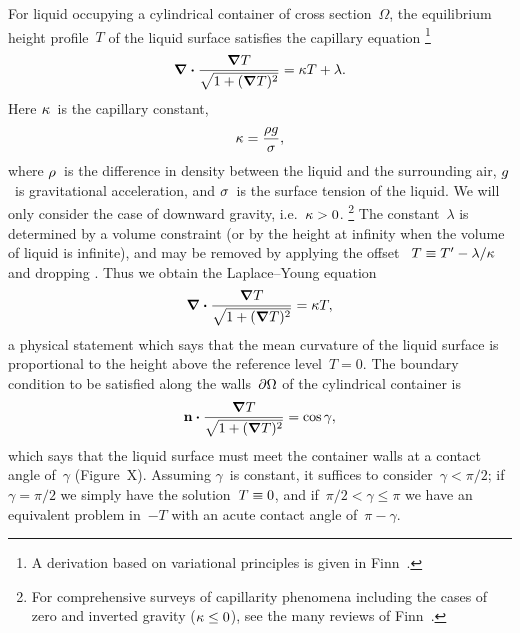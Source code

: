 For liquid occupying a cylindrical container of cross section~$\Omega$,
the equilibrium height profile~$T$ of the liquid surface
satisfies the capillary equation%
\footnote{
  A derivation based on variational principles is given
  in Finn~\cite[Chapter~1]{finn-1986-equilibrium-capillary-surfaces}.
}
\begin{equation}
  \mathop{}\!\boldsymbol{\mathbf{\nabla}} \boldsymbol{\cdot} \frac{\mathop{}\!\boldsymbol{\mathbf{\nabla}} T}{\sqrt{1 + (\mathop{}\!\boldsymbol{\mathbf{\nabla}} T)^2}} = \kappa T + \lambda.
  \label{eq:capillary}
\end{equation}
Here $\kappa$~is the capillary constant,
\begin{equation}
  \kappa = \frac{\rho g}{\sigma},
  \label{eq:capillary-constant}
\end{equation}
where $\rho$~is the difference in density
between the liquid and the surrounding air,
$g$~is gravitational acceleration,
and $\sigma$~is the surface tension of the liquid.
We will only consider the case of downward gravity,
i.e.~$\kappa > 0$.%
\footnote{
  For comprehensive surveys of capillarity phenomena including the cases of
  zero and inverted gravity ($\kappa \le 0$),
  see the many reviews of Finn~\cite{
    finn-1974-capillarity-phenomena,
    finn-1999-capillary-surface-interfaces,
    finn-2002-eight-properties-capillary-surfaces,
    finn-2002-some-properties-capillary-surfaces
  }.
}
The constant~$\lambda$ is determined by a volume constraint
(or by the height at infinity when the volume of liquid is infinite),
and may be removed by applying the offset~%
  $T \equiv T' - \lambda / \kappa$
and dropping \offsetmarks.
Thus we obtain the Laplace--Young equation
\begin{equation}
  \mathop{}\!\boldsymbol{\mathbf{\nabla}} \boldsymbol{\cdot} \frac{\mathop{}\!\boldsymbol{\mathbf{\nabla}} T}{\sqrt{1 + (\mathop{}\!\boldsymbol{\mathbf{\nabla}} T)^2}} = \kappa T,
  \label{eq:laplace-young}
\end{equation}
a physical statement which says that
the mean curvature of the liquid surface
is proportional to the height above the reference level~$T = 0$.
The boundary condition to be satisfied along the walls~$\mathop{}\!\partial\Omega$
of the cylindrical container is
\begin{equation}
  \mathop{}\!\boldsymbol{\mathbf{n}} \boldsymbol{\cdot} \frac{\mathop{}\!\boldsymbol{\mathbf{\nabla}} T}{\sqrt{1 + (\mathop{}\!\boldsymbol{\mathbf{\nabla}} T)^2}} = \cos\gamma,
  \label{eq:contact-boundary-condition}
\end{equation}
which says that the liquid surface must meet the container walls
at a contact angle of~$\gamma$
(Figure~X). %
Assuming $\gamma$~is constant,
it suffices to consider~$\gamma < \pi/2$;
if~$\gamma = \pi/2$ we simply have the solution~$T \equiv 0$,
and if~$\pi/2 < \gamma \le \pi$
we have an equivalent problem in~$-T$
with an acute contact angle of~$\pi - \gamma$.

